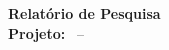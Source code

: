 
\setcounter{page}{1}


\begin{midpage}                        %
  {\centering
    \LARGE \textbf{Relatório de Pesquisa} \\ \vspace{2cm}
    \Large \textbf{Projeto:} \projeto\ -- \siglaprojeto \\ \vspace{1cm}
    \Large \subprojeto \\ \vspace{1cm}
    \Large \projpesq \\ \vspace{1cm}
  }
\end{midpage}
